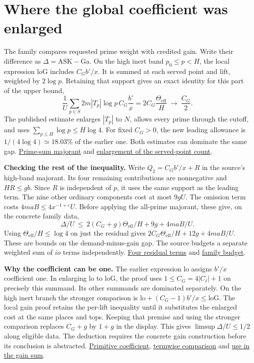 \documentclass[12pt,letterpaper]{article}
\newcommand{\orig}[3]{\href{https://github.com/nousentllc/riemann-hypothesis/blob/40e56bab026552e089d7afcfeff08d2defb9c005/src/#1.lean\#L#2}{#3}}
\newcommand{\para}[1]{\par\medskip\noindent\textbf{#1}\quad}
\newcommand{\pagepart}[1]{\clearpage\section{#1}}
\newcommand{\eff}{\mathrm{eff}}
\newcommand{\gap}{\mathrm{ASK}-\mathrm{Ga}}
\begin{document}
\pagepart{Where the global coefficient was enlarged}
The family compares requested prime weight with credited gain. Write their difference as \(\Delta=\gap\). On the high inert band \(p_0\le p<H\), the local expression \(\mathrm{loG}\) includes \(C_G b'/x\). It is summed at each served point and lift, weighted by \(2\log p\). Retaining that support gives an exact identity for this part of the upper bound,
\[
 \frac{1}{U}\sum_{p\in S}2m|T_p|\log p\, C_G\frac{b'}x
 =2 C_G\frac{\Theta_{\eff}}H\ \longrightarrow\ \frac{C_G}{2}.
\]
The published estimate enlarges \(|T_p|\) to \(N\), allows every prime through the cutoff, and uses \(\sum_{p\le H}\log p\le H\log4\). For fixed \(C_G>0\), the new leading allowance is \(1/(4\log4)\simeq18.03\%\) of the earlier one. Both estimates can dominate the same gap.
\orig{Formalism/SizeWindowBrackets/ChainSlopeWindows/AdmissibleSchurLemma}{530}{Prime-sum majorant} and \orig{Formalism/SizeWindowBrackets/ChainSlopeWindows/AdmissibleSchurLemma}{837}{enlargement of the served-point count}.

\para{Checking the rest of the inequality.} Write \(Q_2=C_G b'/x+R\) in the source's high-band majorant. Its four remaining contributions are nonnegative and \(HR\le gb\). Since \(R\) is independent of \(p\), it uses the same support as the leading term. The nine other ordinary components cost at most \(9gU\). The omission term costs \(4maB\le4x^{-1+\varepsilon}U\). Before applying the all-prime majorant, these give, on the concrete family data,
\[
 \Delta/U\ \le\ 2(C_G+g)\Theta_{\eff}/H + 9g+4maB/U .
\]
Using \(\Theta_{\eff}/H\le\log4\) on just the residual gives \(2C_G\Theta_{\eff}/H+12g+4maB/U\). These are bounds on the demand-minus-gain gap. The source budgets a separate weighted sum of \(io\) terms independently. \orig{Formalism/SizeWindowBrackets/ChainSlopeWindows/OneLeThresholdMulPowers}{444}{Four residual terms} and \orig{Formalism/SizeWindowBrackets/ChainSlopeWindows/DiscriminantSettingSatisfied}{162}{family budget}.

\para{Why the coefficient can be one.} The earlier expression \(\mathrm{lo}\) assigns \(b'/x\) coefficient one. In enlarging \(\mathrm{lo}\) to \(\mathrm{loG}\), the proof uses \(1\le C_G=4|C_\ell|+1\) on precisely this summand. Its other summands are dominated separately. On the high inert branch the stronger comparison is \(\mathrm{lo}+(C_G-1)b'/x\le\mathrm{loG}\). The local gain proof retains the per-lift inequality until it substitutes the enlarged cost at the same places and tops. Keeping that premise and using the stronger comparison replaces \(C_G+g\) by \(1+g\) in the display. This gives \(\limsup\Delta/U\le1/2\) along eligible data. The deduction requires the concrete gain construction before its conclusion is abstracted. \orig{Formalism/SharpRestriction/GrowthBounds/LogarithmicSums/PartnerCountOfCentral}{581}{Primitive coefficient},
\orig{Formalism/SharpRestriction/GrowthBounds/PlaneCountTheoremWithConstants}{139}{termwise comparison} and \orig{Formalism/SharpRestriction/GrowthBounds/PlaneCountTheoremWithConstants}{761}{use in the gain sum}.
\end{document}
